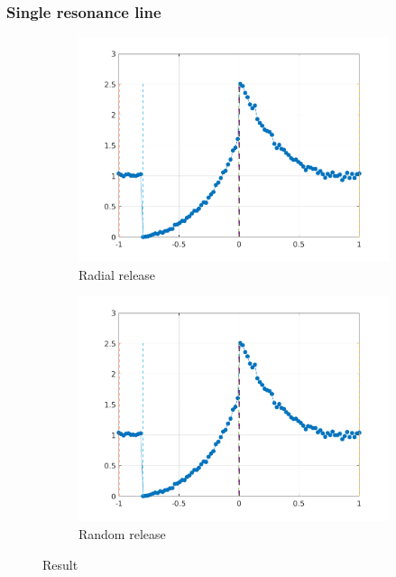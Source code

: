 \documentclass[../main/main.tex]{subfiles}
\begin{document}
\subsubsection{Single resonance line}
\begin{figure}[!htbp]
\centering
\hspace*{-0.5in}
\begin{subfigure}{.6\textwidth}
\includegraphics[width=1\textwidth]{../../two_resonance_lines/figures/reference_solution_xmuestart.png}
\caption{Radial release}
\end{subfigure}%
\begin{subfigure}{.6\textwidth}
\includegraphics[width=1\textwidth]{../../two_resonance_lines/figures/reference_solution_xmuestart.png}
\caption{Random release}
\end{subfigure}
\caption{Result}
\label{PCyg_mu_eq_1_test}
\end{figure}
\end{document}
